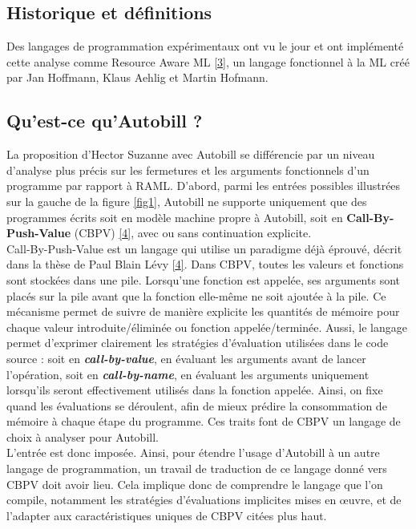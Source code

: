 \documentclass[12pt]{article}
\begin{document}
\subsection{Historique et définitions}\label{historique-et-duxe9finitions}
Des langages de programmation expérimentaux ont vu le jour et ont implémenté cette analyse comme Resource Aware ML \protect\hyperlink{ref-RAML}{{[}3{]}}, un langage fonctionnel à la ML créé par Jan Hoffmann, Klaus Aehlig et Martin Hofmann.

\hypertarget{quest-ce-quautobill}{%
      \subsection{Qu'est-ce qu'Autobill ?}\label{quest-ce-quautobill}}

La proposition d'Hector Suzanne avec Autobill se différencie par un
niveau d'analyse plus précis sur les fermetures et les arguments
fonctionnels d'un programme par rapport à RAML. D'abord, parmi les entrées possibles
illustrées sur la gauche de la figure \ref{fig1}, Autobill ne supporte
uniquement que des programmes écrits soit en modèle machine propre à
Autobill, soit en \textbf{Call-By-Push-Value} (CBPV)
\protect\hyperlink{ref-Levy}{{[}4{]}}, avec ou sans continuation
explicite. \\

Call-By-Push-Value est un langage qui utilise un paradigme déjà éprouvé,
décrit dans la thèse de Paul Blain Lévy
\protect\hyperlink{ref-Levy}{{[}4{]}}. Dans CBPV, toutes les valeurs et fonctions sont stockées dans une pile. Lorsqu'une fonction est appelée, ses arguments sont placés sur la pile avant que la fonction elle-même ne soit ajoutée à la pile. Ce mécanisme permet de suivre de manière explicite les quantités de mémoire pour chaque valeur introduite/éliminée ou fonction appelée/terminée. Aussi,
le langage permet d'exprimer clairement les stratégies d'évaluation utilisées dans le code source : soit en \textbf{\textit{call-by-value}}, en évaluant les arguments avant de lancer l'opération, soit en \textbf{\textit{call-by-name}}, en évaluant les arguments uniquement lorsqu’ils seront effectivement utilisés dans la fonction appelée. Ainsi, on fixe quand les évaluations se déroulent, afin de mieux prédire la consommation de mémoire à chaque
étape du programme. Ces traits font de CBPV un langage de choix à analyser pour Autobill. \\

L'entrée est donc imposée. Ainsi, pour étendre l'usage d'Autobill à un
autre langage de programmation, un travail de traduction de ce langage
donné vers CBPV doit avoir lieu. Cela implique donc de comprendre le
langage que l'on compile, notamment les stratégies d'évaluations
implicites mises en œuvre, et de l'adapter aux caractéristiques uniques
de CBPV citées plus haut. \\
\end{document}
